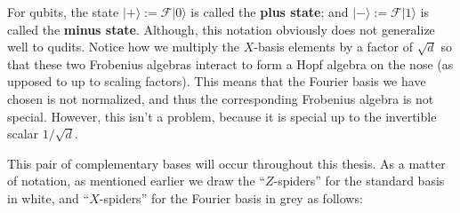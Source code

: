 For qubits, the  state $|+\rangle:=\mathcal{F}|0\rangle$ is called the {\bf plus state}; and  $|-\rangle:=\mathcal{F}|1\rangle$ is called the {\bf minus state}.  Although, this notation obviously does not generalize well to qudits.  
Notice how we multiply the $X$-basis elements by a factor of $\sqrt d$ so that these two Frobenius algebras interact to form a Hopf algebra on the nose (as upposed to up to scaling factors).  This means that the Fourier basis we have chosen is not normalized, and thus the corresponding Frobenius algebra is not special.  However, this isn't a problem, because it is special up to the invertible  scalar $1/\sqrt{d}$.

This pair of complementary bases will occur throughout this thesis.  As a matter of notation, as mentioned earlier we draw the ``$Z$-spiders'' for the standard basis in white,
and ``$X$-spiders'' for the Fourier basis in  grey as follows:

